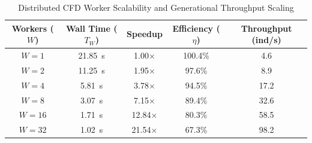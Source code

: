 \begin{table}[t]
\centering
\caption{Distributed CFD Worker Scalability and Generational Throughput Scaling}
\label{tab:worker_scalability}
\small
\begin{tabular}{ccccc}
\hline
\textbf{Workers ($W$)} &
\textbf{Wall Time ($T_W$)} &
\textbf{Speedup} &
\textbf{Efficiency ($\eta$)} &
\textbf{Throughput (ind/s)} \\
\hline
$W = 1$  & 21.85~s & 1.00$\times$ & 100.4\% &  4.6 \\
$W = 2$  & 11.25~s & 1.95$\times$ &  97.6\% &  8.9 \\
$W = 4$  &  5.81~s & 3.78$\times$ &  94.5\% & 17.2 \\
$W = 8$  &  3.07~s & 7.15$\times$ &  89.4\% & 32.6 \\
$W = 16$ &  1.71~s & 12.84$\times$ & 80.3\% & 58.5 \\
$W = 32$ &  1.02~s & 21.54$\times$ & 67.3\% & 98.2 \\
\hline
\end{tabular}
\normalsize
\end{table}

